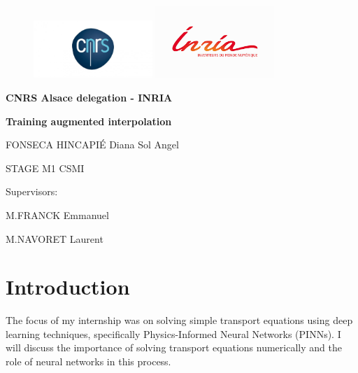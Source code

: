 \documentclass{article}
\begin{document}
\begin{titlepage}
\begin{figure} 
\includegraphics[width=0.4\textwidth]{images/cnrslogo.jpeg}
\includegraphics[width=0.4\textwidth]{images/inria.png}
    \centering
\end{figure}

\centering
\title{}\author{}\date{}
\centering
\vspace{3cm}
{\bfseries\LARGE CNRS Alsace delegation - INRIA \par}
\vspace{4cm}
{\bfseries\LARGE Training augmented interpolation \par}
\vspace{1cm}
{\Large FONSECA HINCAPIÉ Diana Sol Angel\par}
\vspace{1cm}
{\Large STAGE M1 CSMI \par}
\vspace{3cm}
{\Large Supervisors: \par}
\vspace{0.5cm}
{\Large M.FRANCK Emmanuel\par}
\vspace{0.5cm}
{\Large M.NAVORET Laurent\par}
\end{titlepage}


\maketitle
\tableofcontents 
\newpage






\section{Introduction}
The focus of my internship was on solving simple transport equations using deep learning techniques, specifically Physics-Informed Neural Networks (PINNs). I will discuss the importance of solving transport equations numerically and the role of neural networks in this process.
\end{document}

